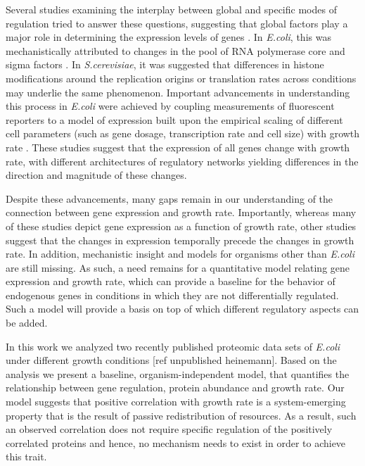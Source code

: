 \documentclass[notitlepage]{article}
\begin{document}
Several studies examining the interplay between global and specific modes of regulation tried to answer these questions, suggesting that global factors play a major role in determining the expression levels of genes \parencite{Gasch2000, Klumpp2009a,Scott2010}.
In \emph{E.coli}, this was mechanistically attributed to changes in the pool of RNA polymerase core and sigma factors \parencite{Klumpp2008}.
In \emph{S.cerevisiae}, it was suggested that differences in histone modifications around the replication origins \parencite{regenberg2006} or translation rates \parencite{Gasch2000} across conditions may underlie the same phenomenon.
Important advancements in understanding this process in \emph{E.coli} were achieved by coupling measurements of fluorescent reporters to a model of expression built upon the empirical scaling of different cell parameters (such as gene dosage, transcription rate and cell size) with growth rate \parencite{Klumpp2009a}.
These studies suggest that the expression of all genes change with growth rate, with different architectures of regulatory networks yielding differences in the direction and magnitude of these changes. 

Despite these advancements, many gaps remain in our understanding of the connection between gene expression and growth rate.
Importantly, whereas many of these studies depict gene expression as a function of growth rate, other studies suggest that the changes in expression temporally precede the changes in growth rate\parencite{levy2007}.
In addition, mechanistic insight and models for organisms other than \emph{E.coli} are still missing.
As such, a need remains for a quantitative model relating gene expression and growth rate, which can provide a baseline for the behavior of endogenous genes in conditions in which they are not differentially regulated.
Such a model will provide a basis on top of which different regulatory aspects can be added.

In this work we analyzed two recently published proteomic data sets of \emph{E.coli} under different growth conditions \parencite{Valgepea2013} [ref unpublished heinemann].
Based on the analysis we present a baseline, organism-independent model, that quantifies the relationship between gene regulation, protein abundance and growth rate.
Our model suggests that positive correlation with growth rate is a system-emerging property that is the result of passive redistribution of resources.
As a result, such an observed correlation does not require specific regulation of the positively correlated proteins and hence, no mechanism needs to exist in order to achieve this trait.
\end{document}
